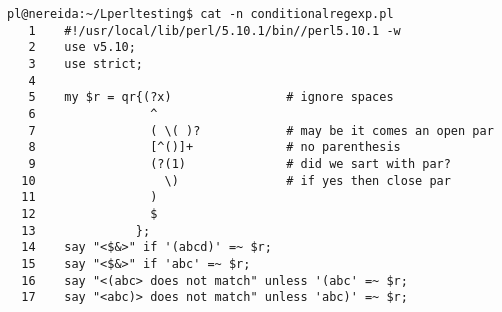 \begin{latexonly}
\begin{verbatim}
pl@nereida:~/Lperltesting$ cat -n conditionalregexp.pl
   1    #!/usr/local/lib/perl/5.10.1/bin//perl5.10.1 -w
   2    use v5.10;
   3    use strict;
   4  
   5    my $r = qr{(?x)                # ignore spaces
   6                ^
   7                ( \( )?            # may be it comes an open par
   8                [^()]+             # no parenthesis
   9                (?(1)              # did we sart with par?
  10                  \)               # if yes then close par
  11                )
  12                $
  13              };
  14    say "<$&>" if '(abcd)' =~ $r;
  15    say "<$&>" if 'abc' =~ $r;
  16    say "<(abc> does not match" unless '(abc' =~ $r;
  17    say "<abc)> does not match" unless 'abc)' =~ $r;
\end{verbatim}
\end{latexonly}
